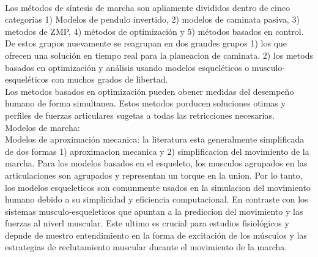 \documentclass[10pt,onecolumn,twoside,letterpaper]{article}
\begin{document}
\href{run:/home/jackmaster/Downloads/[2011 T Geijtenbeek and N Pronost and A Egges and M H Overmars] Art Interactive Character Animation using Simulated Physics.pdf}{
}\cite{Geijtenbeek2011}\\
Los m\'etodos de s\'intesis de marcha son apliamente divididos dentro de cinco categorias 1) Modelos de pendulo invertido, 2) modelos de caminata pasiva, 3) metodos de ZMP, 4) m\'etodos de optimizaci\'on y 5) m\'etodos basados en control. De estos grupos nuevamente se reagrupan en dos grandes grupos 1) los que ofrecen una soluci\'on en tiempo real para la planeacion de caminata. 2) los metods basados en optimizaci\'on y an\'alisis usando modelos esquel\'eticos o musculo-esquel\'eticos con muchos grados de libertad.\cite{Xiang2010}\\
Los metodos basados en optimizaci\'on pueden obener medidas del desempe\~no humano de forma simultanea. Estos metodos porducen soluciones otimas y perfiles de fuerzas articulares sugetas a todas las retricciones necesarias.\cite{Xiang2010}\\
Modelos de marcha:\\
Modelos de aproximaci\'on mecanica: la literatura esta generalmente simplificada de dos formas 1) aproximacion mecanica y 2) simplificacion del movimiento de la marcha. Para los modelos basados en el esqueleto, los musculos agrupados en las articulaciones son agrupados y representan un torque en la union. Por lo tanto, los modelos esqueleticos son comunmente usados en la simulacion del movimiento humano debido a su simplicidad y eficiencia computacional. En contraste con los sistemas musculo-esqueleticos que apuntan a la prediccion del movimiento y las fuerzas al niverl muscular. Este ultimo es crucial para estudios fisiol\'ogicos y depnde de nuestro entendimiento en la forma de excitaci\'on de los m\'usculos y las estrategias de reclutamiento muscular durante el movimiento de la marcha.\cite{Xiang2010}\\
\end{document}
